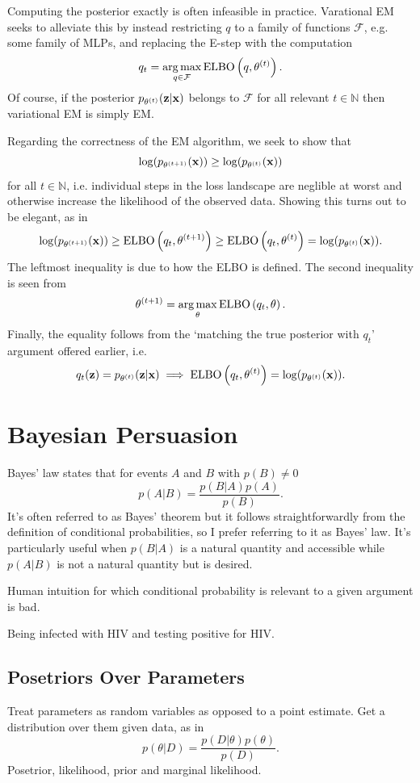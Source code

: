 \documentclass[11pt]{article}
\begin{document}
\begin{appendices}
\begin{tcolorbox}[title={\centering\textbf{Variational EM}}, colback=myLightBlue, colbacktitle=myDarkBlue, colframe=myDarkBlue, coltitle=white]
    Computing the posterior exactly is often infeasible in practice. Varational EM seeks to alleviate this by instead restricting $q$ to a family of functions $\mathcal{F}$, e.g. some family of MLPs, and replacing the E-step with the computation
    $$
    q_t
    =
    \operatorname*{arg\,max}_{q\in\mathcal{F}}\text{ELBO}\left(q,\theta^{(t)}\right).
    $$
    Of course, if the posterior $p_{\theta^{(t)}}(\mathbf{z}|\mathbf{x})$ belongs to $\mathcal{F}$ for all relevant $t\in\mathbb{N}$ then variational EM is simply EM.
\end{tcolorbox}
Regarding the correctness of the EM algorithm, we seek to show that
$$
\log(p_{\theta^{(t+1)}}(\mathbf{x}))
\geq
\log(p_{\theta^{(t)}}(\mathbf{x}))
$$
for all $t\in\mathbb{N}$, i.e. individual steps in the loss landscape are neglible at worst and otherwise increase the likelihood of the observed data. Showing this turns out to be elegant, as in
$$
\log(p_{\theta^{(t+1)}}(\mathbf{x}))
\geq
\text{ELBO}\left(q_t,\theta^{(t+1)}\right)
\geq
\text{ELBO}\left(q_t,\theta^{(t)}\right)
=
\log(p_{\theta^{(t)}}(\mathbf{x})).
$$
The leftmost inequality is due to how the ELBO is defined. The second inequality is seen from
$$
\theta^{(t+1)}
=
\operatorname*{arg\,max}_{\theta}\text{ELBO}\left(q_t,\theta\right).
$$
Finally, the equality follows from the `matching the true posterior with $q_t$' argument offered earlier, i.e.
$$
q_t(\mathbf{z})=p_{\theta^{(t)}}(\mathbf{z}|\mathbf{x})
\implies
\text{ELBO}\left(q_t,\theta^{(t)}\right)=\log(p_{\theta^{(t)}}(\mathbf{x})).
$$

\section{Bayesian Persuasion}
Bayes' law states that for events $A$ and $B$ with $p(B)\neq0$
$$
p(A|B)
=
\frac{p(B|A)p(A)}{p(B)}.
$$
It's often referred to as Bayes' theorem but it follows straightforwardly from the definition of conditional probabilities, so I prefer referring to it as Bayes' law. It's particularly useful when $p(B|A)$ is a natural quantity and accessible while $p(A|B)$ is not a natural quantity but is desired.

Human intuition for which conditional probability is relevant to a given argument is bad.
\begin{example}
    Being infected with HIV and testing positive for HIV.
\end{example}

\subsection{Posetriors Over Parameters}
Treat parameters as random variables as opposed to a point estimate. Get a distribution over them given data, as in
$$
p(\theta|D)
=
\frac{p(D|\theta)p(\theta)}{p(D)}.
$$
Posetrior, likelihood, prior and marginal likelihood.


\end{appendices}
\end{document}
